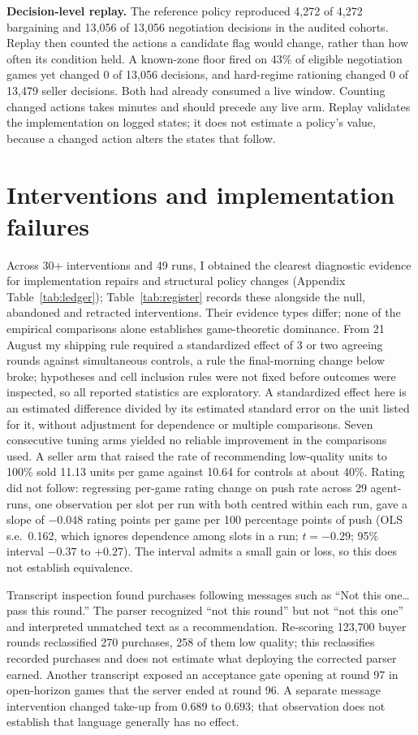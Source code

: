 \documentclass{article}
\begin{document}
\textbf{Decision-level replay.} The reference policy reproduced 4,272 of 4,272
bargaining and 13,056 of 13,056 negotiation decisions in the audited cohorts.
Replay then counted the actions a candidate flag would change, rather than how
often its condition held. A known-zone floor fired on 43\% of eligible negotiation
games yet changed 0 of 13,056 decisions, and hard-regime rationing changed 0 of
13,479 seller decisions. Both had already
consumed a live window. Counting changed actions takes minutes and should precede
any live arm. Replay validates the implementation on logged states; it does not
estimate a policy's value, because a changed action alters the states that
follow.

\section{Interventions and implementation failures}
Across 30+ interventions and 49 runs, I obtained the clearest diagnostic
evidence for implementation repairs and structural policy changes (Appendix
Table~\ref{tab:ledger}); Table~\ref{tab:register} records these alongside the
null, abandoned and retracted interventions. Their evidence types
differ; none of the empirical comparisons alone establishes game-theoretic
dominance. From 21 August my shipping rule required a standardized effect of 3
or two agreeing rounds against simultaneous controls, a rule the final-morning
change below broke; hypotheses and cell inclusion rules were not fixed before
outcomes were inspected, so all reported statistics are exploratory. A
standardized effect here is an estimated difference divided by its estimated
standard error on the unit listed for it, without adjustment for dependence or
multiple comparisons. Seven consecutive tuning arms
yielded no reliable improvement in the comparisons used. A seller arm that
raised the rate of recommending low-quality units to 100\% sold 11.13 units per
game against 10.64 for controls at about 40\%. Rating did not follow: regressing
per-game rating change on push rate across 29 agent-runs, one observation per
slot per run with both centred within each run, gave a slope of $-0.048$ rating
points per game per 100 percentage points of push (OLS s.e.\ 0.162, which ignores
dependence among slots in a run; $t=-0.29$; 95\% interval $-0.37$ to $+0.27$). The interval admits a small gain
or loss, so this does not establish equivalence.

Transcript inspection found purchases following messages such as ``Not this
one\ldots pass this round.'' The parser recognized ``not this round'' but not
``not this one'' and interpreted unmatched text as a recommendation. Re-scoring
123,700 buyer rounds reclassified 270 purchases, 258 of them low quality; this
reclassifies recorded purchases and does not estimate what deploying the corrected
parser earned. Another transcript exposed an acceptance gate opening at round 97
in open-horizon games that the server ended at round 96. A separate message intervention changed take-up from
0.689 to 0.693; that observation does not establish that language generally has
no effect.
\end{document}
